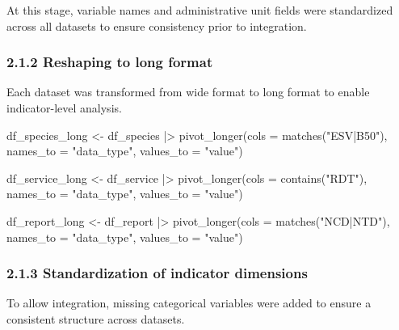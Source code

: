 \documentclass[
  letterpaper,
  DIV=11,
  numbers=noendperiod]{scrartcl}
\newenvironment{Shaded}{\begin{snugshade}}{\end{snugshade}}
\newcommand{\AttributeTok}[1]{\textcolor[rgb]{0.40,0.45,0.13}{#1}}
\newcommand{\FunctionTok}[1]{\textcolor[rgb]{0.28,0.35,0.67}{#1}}
\newcommand{\NormalTok}[1]{\textcolor[rgb]{0.00,0.23,0.31}{#1}}
\newcommand{\OtherTok}[1]{\textcolor[rgb]{0.00,0.23,0.31}{#1}}
\newcommand{\SpecialCharTok}[1]{\textcolor[rgb]{0.37,0.37,0.37}{#1}}
\newcommand{\StringTok}[1]{\textcolor[rgb]{0.13,0.47,0.30}{#1}}
\begin{document}
At this stage, variable names and administrative unit fields were
standardized across all datasets to ensure consistency prior to
integration.

\subsubsection{2.1.2 Reshaping to long
format}\label{reshaping-to-long-format}

Each dataset was transformed from wide format to long format to enable
indicator-level analysis.

\begin{Shaded}
\begin{Highlighting}[]
\NormalTok{df\_species\_long }\OtherTok{\textless{}{-}}\NormalTok{ df\_species }\SpecialCharTok{|\textgreater{}}
  \FunctionTok{pivot\_longer}\NormalTok{(}\AttributeTok{cols =} \FunctionTok{matches}\NormalTok{(}\StringTok{"ESV|B50"}\NormalTok{),}
               \AttributeTok{names\_to =} \StringTok{"data\_type"}\NormalTok{,}
               \AttributeTok{values\_to =} \StringTok{"value"}\NormalTok{)}

\NormalTok{df\_service\_long }\OtherTok{\textless{}{-}}\NormalTok{ df\_service }\SpecialCharTok{|\textgreater{}}
  \FunctionTok{pivot\_longer}\NormalTok{(}\AttributeTok{cols =} \FunctionTok{contains}\NormalTok{(}\StringTok{"RDT"}\NormalTok{),}
               \AttributeTok{names\_to =} \StringTok{"data\_type"}\NormalTok{,}
               \AttributeTok{values\_to =} \StringTok{"value"}\NormalTok{)}

\NormalTok{df\_report\_long }\OtherTok{\textless{}{-}}\NormalTok{ df\_report }\SpecialCharTok{|\textgreater{}}
  \FunctionTok{pivot\_longer}\NormalTok{(}\AttributeTok{cols =} \FunctionTok{matches}\NormalTok{(}\StringTok{"NCD|NTD"}\NormalTok{),}
               \AttributeTok{names\_to =} \StringTok{"data\_type"}\NormalTok{,}
               \AttributeTok{values\_to =} \StringTok{"value"}\NormalTok{)}
\end{Highlighting}
\end{Shaded}

\subsubsection{2.1.3 Standardization of indicator
dimensions}\label{standardization-of-indicator-dimensions}

To allow integration, missing categorical variables were added to ensure
a consistent structure across datasets.
\end{document}
